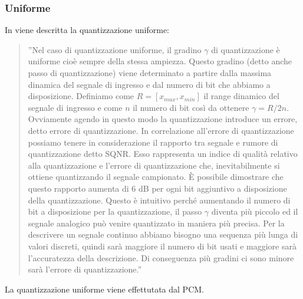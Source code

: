 \documentclass[a4paper]{report} %
\begin{document}
\subsubsection{Uniforme}
In \cite{art:rif.4} viene descritta la quantizzazione uniforme:
\begin{quote}
	''Nel caso di quantizzazione uniforme, il gradino $\gamma$ di quantizzazione è uniforme cioè sempre della stessa ampiezza. Questo gradino (detto anche passo di quantizzazione) viene determinato a partire dalla massima dinamica del segnale di ingresso e dal numero di bit che abbiamo a disposizione. Definiamo come $R=[x_{max},x_{min}]$ il range dinamico del segnale di ingresso e come $n$ il numero di bit così da ottenere $\gamma=R/2n$. Ovviamente agendo in questo modo la quantizzazione introduce un errore, detto errore di quantizzazione. In correlazione all'errore di quantizzazione possiamo tenere in considerazione il rapporto tra segnale e rumore di quantizzazione detto SQNR. Esso rappresenta un indice di qualità relativo alla quantizzazione e l'errore di quantizzazione che, inevitabilmente si ottiene quantizzando il segnale campionato. È possibile dimostrare che questo rapporto aumenta di 6 dB per ogni bit aggiuntivo a disposizione della quantizzazione. Questo è intuitivo perché aumentando il numero di bit a disposizione per la quantizzazione, il passo $\gamma$ diventa più piccolo ed il segnale analogico può venire quantizzato in maniera più precisa. Per la descrivere un segnale continuo abbiamo bisogno una sequenza più lunga di valori discreti, quindi sarà maggiore il numero di bit usati e maggiore sarà l'accuratezza della descrizione. Di conseguenza più gradini ci sono minore sarà l'errore di quantizzazione.''   
\end{quote}
La quantizzazione uniforme viene effettutata dal PCM.
\end{document}
